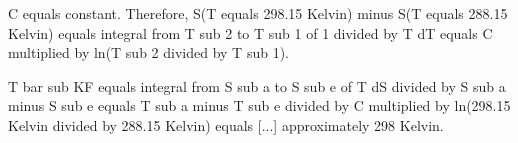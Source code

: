 C equals constant. Therefore, S(T equals 298.15 Kelvin) minus S(T equals 288.15 Kelvin) equals integral from T sub 2 to T sub 1 of 1 divided by T dT equals C multiplied by ln(T sub 2 divided by T sub 1).  

T bar sub KF equals integral from S sub a to S sub e of T dS divided by S sub a minus S sub e equals T sub a minus T sub e divided by C multiplied by ln(298.15 Kelvin divided by 288.15 Kelvin) equals [...] approximately 298 Kelvin.